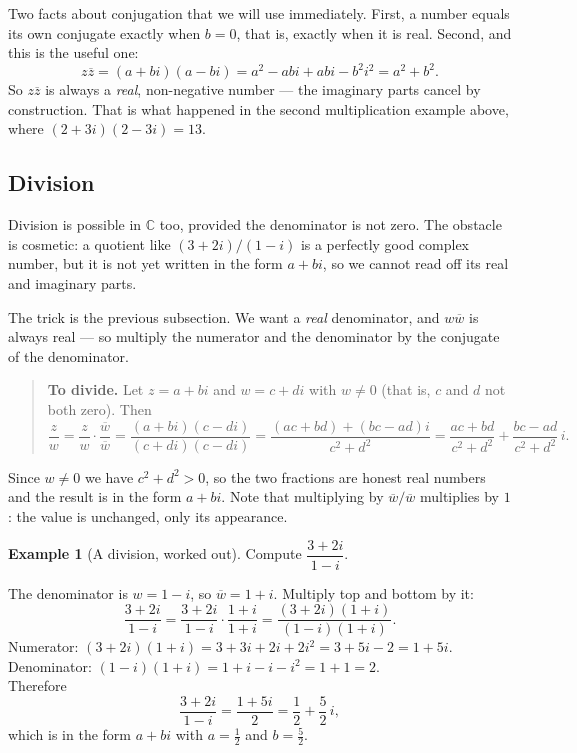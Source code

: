 \documentclass[11pt]{article}
\theoremstyle{definition}
\newtheorem{ex}{Example}
\theoremstyle{remark}
\newcommand{\C}{\mathbb{C}}
\newcommand{\conj}[1]{\overline{#1}}
\begin{document}
\noindent Two facts about conjugation that we will use immediately. First, a
number equals its own conjugate exactly when $b=0$, that is, exactly when it is
real. Second, and this is the useful one:
\[
  z\conj{z} = (a+bi)(a-bi) = a^{2} - abi + abi - b^{2}i^{2} = a^{2}+b^{2} .
\]
So $z\conj{z}$ is always a \emph{real}, non-negative number --- the imaginary
parts cancel by construction. That is what happened in the second multiplication
example above, where $(2+3i)(2-3i)=13$.

\subsection{Division}
Division is possible in $\C$ too, provided the denominator is not zero. The
obstacle is cosmetic: a quotient like $(3+2i)/(1-i)$ is a perfectly good complex
number, but it is not yet written in the form $a+bi$, so we cannot read off its
real and imaginary parts.

The trick is the previous subsection. We want a \emph{real} denominator, and
$w\conj{w}$ is always real --- so multiply the numerator and the denominator by
the conjugate of the denominator.

\begin{quote}
\textbf{To divide.} Let $z=a+bi$ and $w=c+di$ with $w\neq 0$ (that is, $c$ and
$d$ not both zero). Then
\[
  \frac{z}{w}
  = \frac{z}{w}\cdot\frac{\conj{w}}{\conj{w}}
  = \frac{(a+bi)(c-di)}{(c+di)(c-di)}
  = \frac{(ac+bd)+(bc-ad)i}{c^{2}+d^{2}}
  = \frac{ac+bd}{c^{2}+d^{2}} + \frac{bc-ad}{c^{2}+d^{2}}\,i .
\]
\end{quote}

\noindent Since $w\neq0$ we have $c^{2}+d^{2}>0$, so the two fractions are
honest real numbers and the result is in the form $a+bi$. Note that multiplying
by $\conj{w}/\conj{w}$ multiplies by $1$: the value is unchanged, only its
appearance.

\begin{ex}[A division, worked out]
Compute $\dfrac{3+2i}{1-i}$.

The denominator is $w=1-i$, so $\conj{w}=1+i$. Multiply top and bottom by it:
\[
  \frac{3+2i}{1-i}
  = \frac{3+2i}{1-i}\cdot\frac{1+i}{1+i}
  = \frac{(3+2i)(1+i)}{(1-i)(1+i)} .
\]
Numerator: $(3+2i)(1+i) = 3+3i+2i+2i^{2} = 3+5i-2 = 1+5i$. \\
Denominator: $(1-i)(1+i) = 1+i-i-i^{2} = 1+1 = 2$. \\
Therefore
\[
  \frac{3+2i}{1-i} = \frac{1+5i}{2} = \frac{1}{2}+\frac{5}{2}\,i ,
\]
which is in the form $a+bi$ with $a=\tfrac12$ and $b=\tfrac52$.
\end{ex}
\end{document}

